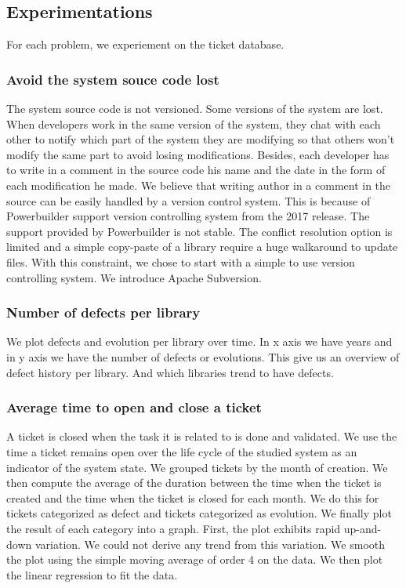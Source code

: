 \documentclass[10pt,conference]{IEEEtran}
\begin{document}
 \subsection{Experimentations}
For each problem, we experiement on the ticket database. 
\subsubsection{Avoid the system souce code lost}
The system source code is not versioned.  Some versions of the system are lost. 
When developers work in the same version of the system, they chat with each other to notify which part of the system they are modifying so that others won't modify the same part to avoid losing modifications. Besides, each developer has to write in a comment in the source code his name and the date in the form of each modification he made.  We believe that writing author in a comment in the source can be easily handled by a version control system.
This is because of Powerbuilder support version controlling system from the 2017 release. 
The support provided by Powerbuilder is not stable.
The conflict resolution option is limited and a simple copy-paste of a library require a huge walkaround to update files. 
With this constraint, we chose to start with a simple to use version controlling system. We introduce Apache Subversion. 
 \subsubsection{Number of defects per library}
We plot  defects and evolution per library over time.  In x axis we have years and in y axis  we have the number of defects  or evolutions.
This give us an overview of defect  history per library. And  which libraries   trend to have defects.
\subsubsection{ Average time to open and close a ticket}
A ticket is closed when the task it is related to is done and validated. 
We use the time a ticket remains open over the life cycle of the studied system as an indicator of the system state. 
We grouped tickets by the month of creation.
We then compute the average of  the duration between the time when the ticket is created and the time when the ticket is closed for each month.  
We do this for tickets categorized as defect and tickets categorized as evolution. 
We finally plot the result of each category into a graph.  First, the plot exhibits rapid up-and-down variation.
We could not derive any trend from this variation. 
We smooth the plot using the simple moving average of order 4 on the data.  
We then plot the linear regression to fit the data.
\end{document}
